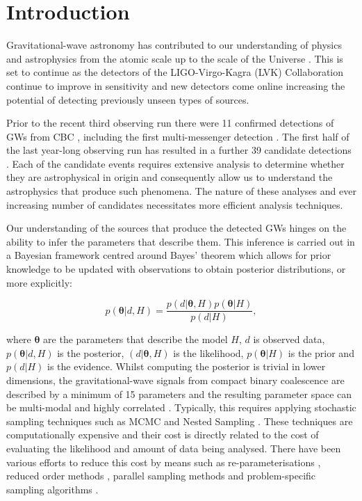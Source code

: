 \documentclass[%
 reprint,
nofootinbib,
 amsmath,amssymb,
 aps,
 prd,
]{revtex4-2}
\renewcommand{\vec}[1]{\boldsymbol{#1}}
\begin{document}
\section{Introduction}

Gravitational-wave astronomy has contributed to our understanding of physics and astrophysics from the atomic scale up to the scale of the Universe \cite{GBM:2017lvd,Abbott:2018exr,Abbott:2019yzh}. This is set to continue as the detectors of the LIGO-Virgo-Kagra (LVK) Collaboration continue to improve in sensitivity \cite{Aasi:2013wya} and new detectors come online \cite{Iyer:2011indigo} increasing the potential of detecting previously unseen types of sources.

Prior to the recent third observing run there were 11 confirmed detections of \acp{GW} from \ac{CBC} \cite{LIGOScientific:2018mvr}, including the first multi-messenger detection \cite{GW170817discovery}. The first half of the last year-long observing run has resulted in a further 39 candidate detections \cite{GWTC2:2020}. Each of the candidate events requires extensive analysis to determine whether they are astrophysical in origin and consequently allow us to understand the astrophysics that produce such phenomena. The nature of these analyses and ever increasing number of candidates necessitates more efficient analysis techniques.

Our understanding of the sources that produce the detected \acp{GW} hinges on the ability to infer the parameters that describe them. This inference is carried out in a Bayesian framework \cite{Aasi:2013jjl,TheLIGOScientific:2016wfe} centred around Bayes' theorem which allows for prior knowledge to be updated with observations to obtain posterior distributions, or more explicitly:

\begin{equation}\label{eq:bayes_theorem}
    p(\vec{\theta}|d, H) = \frac{p(d|\vec{\theta}, H)p(\vec{\theta}|H)}{p(d|H)},
\end{equation}

where $\vec{\theta}$ are the parameters that describe the model $H$, $d$ is observed data, $p(\vec{\theta}|d, H)$ is the posterior, $(d|\vec{\theta}, H)$ is the likelihood, $p(\vec{\theta}|H)$ is the prior and $p(d|H)$ is the evidence. Whilst computing the posterior is trivial in lower dimensions, the gravitational-wave signals from compact binary coalescence are described by a minimum of 15 parameters and the resulting parameter space can be multi-modal and highly correlated \cite{Veitch:2015}. Typically, this requires applying stochastic sampling techniques such as \ac{MCMC} \cite{Brooks:2011handbook} and Nested Sampling \cite{Skilling:2006}. These techniques are computationally expensive and their cost is directly related to the cost of evaluating the likelihood and amount of data being analysed. There have been various efforts to reduce this cost by means such as re-parameterisations \cite{Farr:2014system-frame}, reduced order methods \cite{Purrer:2014,Smith:2016}, parallel sampling methods \cite{Handley:2015polychord,Veitch:2021cpnest,Smith:2020pbilby} and problem-specific sampling algorithms \cite{Veitch:2015,Lange:2018RIFT,Biwer:2018PyCBCInf,Ashton:2019}.
\end{document}
